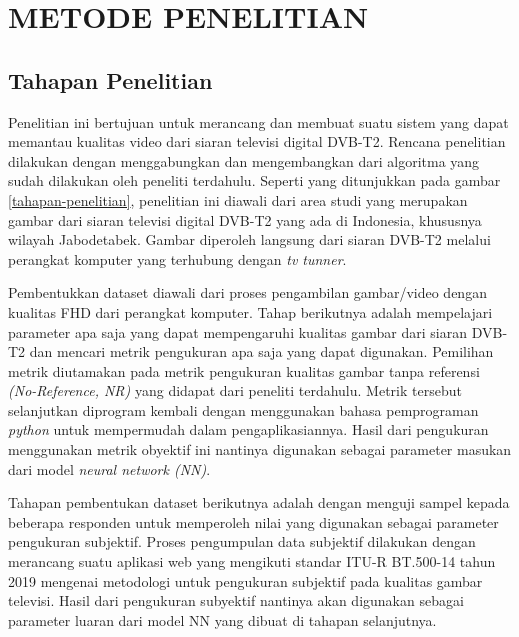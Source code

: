 \chapter{METODE PENELITIAN}

\vspace{1cm}
\section{Tahapan Penelitian}
\hspace{1,2cm}
Penelitian ini bertujuan untuk merancang dan membuat suatu sistem yang dapat memantau kualitas video dari siaran televisi digital DVB-T2. Rencana penelitian dilakukan dengan menggabungkan dan mengembangkan dari algoritma yang sudah dilakukan oleh peneliti terdahulu. Seperti yang ditunjukkan pada gambar \ref{tahapan-penelitian},  penelitian ini diawali dari area studi yang merupakan gambar dari siaran televisi digital DVB-T2 yang ada di Indonesia, khususnya wilayah Jabodetabek. Gambar diperoleh langsung dari siaran DVB-T2 melalui perangkat komputer yang terhubung dengan \textit{tv tunner}.

Pembentukkan dataset diawali dari proses pengambilan gambar/video dengan kualitas FHD dari perangkat komputer. Tahap berikutnya adalah mempelajari parameter apa saja yang dapat mempengaruhi kualitas gambar dari siaran DVB-T2 dan mencari metrik pengukuran apa saja yang dapat digunakan. Pemilihan metrik diutamakan pada metrik pengukuran kualitas gambar tanpa referensi \textit{(No-Reference, NR)} yang didapat dari peneliti terdahulu. Metrik tersebut selanjutkan diprogram kembali dengan menggunakan bahasa pemprograman \textit{python} untuk mempermudah dalam pengaplikasiannya. Hasil dari pengukuran menggunakan metrik obyektif ini nantinya digunakan sebagai parameter masukan dari model \textit{neural network (NN)}.

Tahapan pembentukan dataset berikutnya adalah dengan menguji sampel  kepada beberapa responden untuk memperoleh nilai yang digunakan sebagai parameter pengukuran subjektif.  Proses pengumpulan data subjektif dilakukan dengan merancang suatu aplikasi web yang mengikuti standar ITU-R BT.500-14 tahun 2019 mengenai metodologi untuk pengukuran subjektif  pada kualitas gambar televisi. Hasil dari pengukuran subyektif nantinya akan digunakan sebagai parameter luaran dari model NN yang dibuat di tahapan selanjutnya.

